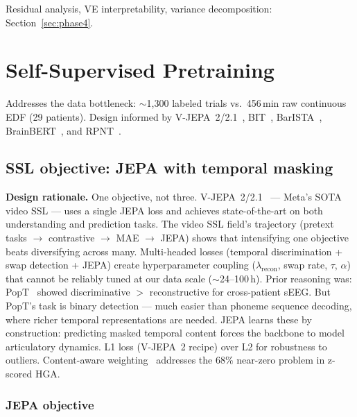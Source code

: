 \documentclass[11pt,letterpaper]{article}
\begin{document}
Residual analysis, VE interpretability, variance decomposition: Section~\ref{sec:phase4}.



\section{Self-Supervised Pretraining}\label{sec:ssl}

Addresses the data bottleneck: ${\sim}$1{,}300 labeled trials vs.\ 456\,min raw continuous EDF (29 patients). Design informed by V-JEPA~2/2.1~\cite{bardes2025vjepa2,bardes2026vjepa21}, BIT~\cite{zhang2026bit}, BarISTA~\cite{oganesian2025}, BrainBERT~\cite{wang2023brainbert}, and RPNT~\cite{fang2026}.

\subsection{SSL objective: JEPA with temporal masking}\label{sec:ssl-objective}

\textbf{Design rationale.} One objective, not three. V-JEPA~2/2.1~\cite{bardes2025vjepa2,bardes2026vjepa21} --- Meta's SOTA video SSL --- uses a single JEPA loss and achieves state-of-the-art on both understanding and prediction tasks. The video SSL field's trajectory (pretext tasks $\to$ contrastive $\to$ MAE $\to$ JEPA) shows that intensifying one objective beats diversifying across many. Multi-headed losses (temporal discrimination + swap detection + JEPA) create hyperparameter coupling ($\lambda_{\text{recon}}$, swap rate, $\tau$, $\alpha$) that cannot be reliably tuned at our data scale (${\sim}$24--100\,h). Prior reasoning was: PopT~\cite{chau2025} showed discriminative $>$ reconstructive for cross-patient sEEG. But PopT's task is binary detection --- much easier than phoneme sequence decoding, where richer temporal representations are needed. JEPA learns these by construction: predicting masked temporal content forces the backbone to model articulatory dynamics. L1 loss (V-JEPA~2 recipe) over L2 for robustness to outliers. Content-aware weighting~\cite{wang2023brainbert} addresses the 68\% near-zero problem in z-scored HGA.

\subsubsection{JEPA objective}
\end{document}
